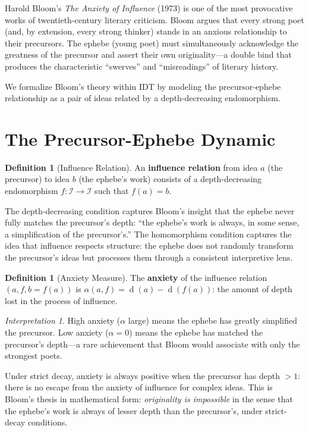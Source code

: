 \documentclass[11pt,openany]{book}
\theoremstyle{definition}
\newtheorem{definition}[axiom]{Definition}
\theoremstyle{plain}
\theoremstyle{remark}
\newtheorem{interpretation}[axiom]{Interpretation}
\newcommand{\IS}{\mathcal{I}}               %
\newcommand{\depth}{\operatorname{d}}       %
\begin{document}
Harold Bloom's \textit{The Anxiety of Influence} (1973) is one of the most provocative works of twentieth-century literary criticism. Bloom argues that every strong poet (and, by extension, every strong thinker) stands in an anxious relationship to their precursors. The ephebe (young poet) must simultaneously acknowledge the greatness of the precursor and assert their own originality---a double bind that produces the characteristic ``swerves'' and ``misreadings'' of literary history.

We formalize Bloom's theory within IDT by modeling the precursor-ephebe relationship as a pair of ideas related by a depth-decreasing endomorphism.

\section{The Precursor-Ephebe Dynamic}

\begin{definition}[Influence Relation]
An \textbf{influence relation} from idea $a$ (the precursor) to idea $b$ (the ephebe's work) consists of a depth-decreasing endomorphism $f : \IS \to \IS$ such that $f(a) = b$.
\end{definition}

The depth-decreasing condition captures Bloom's insight that the ephebe never fully matches the precursor's depth: ``the ephebe's work is always, in some sense, a simplification of the precursor's.'' The homomorphism condition captures the idea that influence respects structure: the ephebe does not randomly transform the precursor's ideas but processes them through a consistent interpretive lens.

\begin{definition}[Anxiety Measure]
The \textbf{anxiety} of the influence relation $(a, f, b = f(a))$ is $\alpha(a, f) = \depth(a) - \depth(f(a))$: the amount of depth lost in the process of influence.
\end{definition}

\begin{interpretation}
High anxiety ($\alpha$ large) means the ephebe has greatly simplified the precursor. Low anxiety ($\alpha = 0$) means the ephebe has matched the precursor's depth---a rare achievement that Bloom would associate with only the strongest poets.

Under strict decay, anxiety is always positive when the precursor has depth $> 1$: there is no escape from the anxiety of influence for complex ideas. This is Bloom's thesis in mathematical form: \emph{originality is impossible} in the sense that the ephebe's work is always of lesser depth than the precursor's, under strict-decay conditions.
\end{interpretation}
\end{document}
